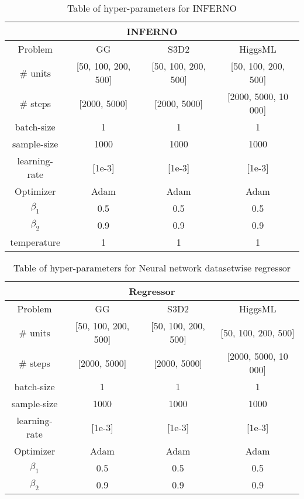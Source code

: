 \begin{table}[ht!]
\centering
\begin{tabular}{||c c c c||} 
 \hline
 \multicolumn{4}{|c|}{INFERNO}\\
 \hline
 Problem & GG & S3D2 & HiggsML \\ [0.5ex] 
 \hline
 \# units & [50, 100, 200, 500] & [50, 100, 200, 500] & [50, 100, 200, 500] \\ 
 \# steps & [2000, 5000] & [2000, 5000] & [2000, 5000, 10 000] \\
 batch-size &  1 &  1 & 1 \\
 sample-size &  1000 &  1000 & 1000 \\
 learning-rate & [1e-3] & [1e-3] & [1e-3] \\
 Optimizer & Adam & Adam & Adam \\
 $\beta_1$ & 0.5 & 0.5 & 0.5 \\
 $\beta_2$ & 0.9 & 0.9 & 0.9 \\
 temperature & 1 & 1 & 1 \\
 \hline
\end{tabular}
\caption{Table of hyper-parameters for INFERNO}
\label{table:HP_INF}
\end{table}



\begin{table}[ht!]
\centering
\begin{tabular}{||c c c c||} 
 \hline
 \multicolumn{4}{|c|}{Regressor}\\
 \hline
 Problem & GG & S3D2 & HiggsML \\ [0.5ex] 
 \hline
 \# units & [50, 100, 200, 500] & [50, 100, 200, 500] & [50, 100, 200, 500] \\ 
 \# steps & [2000, 5000] & [2000, 5000] & [2000, 5000, 10 000] \\
 batch-size &  1 &  1 & 1 \\
 sample-size &  1000 &  1000 & 1000 \\
 learning-rate & [1e-3] & [1e-3] & [1e-3] \\
 Optimizer & Adam & Adam & Adam \\
 $\beta_1$ & 0.5 & 0.5 & 0.5 \\
 $\beta_2$ & 0.9 & 0.9 & 0.9 \\
 \hline
\end{tabular}
\caption{Table of hyper-parameters for Neural network datasetwise regressor}
\label{table:HP_REG}
\end{table}







